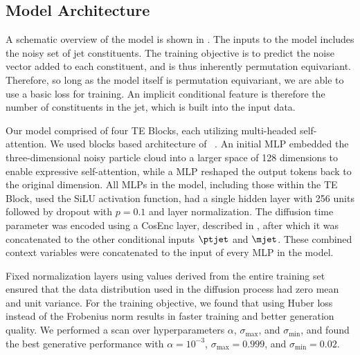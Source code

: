 
\subsection{Model Architecture}

A schematic overview of the \pcjedi model is shown in .
The inputs to the model includes the noisy set of jet constituents.
The training objective is to predict the noise vector added to each constituent, and is thus inherently permutation equivariant.
Therefore, so long as the model itself is permutation equivariant, we are able to use a basic loss for training.
An implicit conditional feature is therefore the number of constituents in the jet, which is built into the input data.

Our model comprised of four TE Blocks, each utilizing multi-headed self-attention.
We used blocks based architecture of ~\textcite{Normformer}.
An initial MLP embedded the three-dimensional noisy particle cloud into a larger space of 128 dimensions to enable expressive self-attention, while a MLP reshaped the output tokens back to the original dimension.
All MLPs in the model, including those within the TE Block, used the SiLU activation function, had a single hidden layer with 256 units followed by dropout with $p=0.1$ and layer normalization.
The diffusion time parameter was encoded using a CosEnc layer, described in , after which it was concatenated to the other conditional inputs $\ptjet$ and $\mjet$.
These combined context variables were concatenated to the input of every MLP in the model.

Fixed normalization layers using values derived from the entire training set ensured that the data distribution used in the diffusion process had zero mean and unit variance.
For the training objective, we found that using Huber loss instead of the Frobenius norm results in faster training and better generation quality.
We performed a scan over hyperparameters $\alpha$, $\sigma_\text{max}$, and $\sigma_\text{min}$, and found the best generative performance with $\alpha=10^{-3}$, $\sigma_\text{max}=0.999$, and $\sigma_\text{min}=0.02$.

